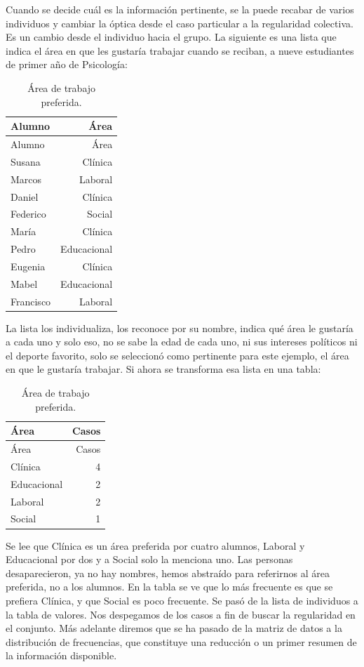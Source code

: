 \documentclass[]{book}
\begin{document}
Cuando se decide cuál es la información pertinente, se la puede recabar de varios individuos y cambiar la óptica desde el caso particular a la regularidad colectiva. Es un cambio desde el individuo hacia el grupo. La siguiente es una lista que indica el área en que les gustaría trabajar cuando se reciban, a nueve estudiantes de primer año de Psicología:

\begin{longtable}[]{@{}lr@{}}
\caption{\label{tab:unnamed-chunk-2}Área de trabajo preferida.}\tabularnewline
\toprule
Alumno & Área\tabularnewline
\midrule
\endfirsthead
\toprule
Alumno & Área\tabularnewline
\midrule
\endhead
Susana & Clínica\tabularnewline
Marcos & Laboral\tabularnewline
Daniel & Clínica\tabularnewline
Federico & Social\tabularnewline
María & Clínica\tabularnewline
Pedro & Educacional\tabularnewline
Eugenia & Clínica\tabularnewline
Mabel & Educacional\tabularnewline
Francisco & Laboral\tabularnewline
\bottomrule
\end{longtable}

La lista los individualiza, los reconoce por su nombre, indica qué área le gustaría a cada uno y solo eso, no se sabe la edad de cada uno, ni sus intereses políticos ni el deporte favorito, solo se seleccionó como pertinente para este ejemplo, el área en que le gustaría trabajar. Si ahora se transforma esa lista en una tabla:

\begin{longtable}[]{@{}lr@{}}
\caption{\label{tab:unnamed-chunk-3}Área de trabajo preferida.}\tabularnewline
\toprule
Área & Casos\tabularnewline
\midrule
\endfirsthead
\toprule
Área & Casos\tabularnewline
\midrule
\endhead
Clínica & 4\tabularnewline
Educacional & 2\tabularnewline
Laboral & 2\tabularnewline
Social & 1\tabularnewline
\bottomrule
\end{longtable}

Se lee que Clínica es un área preferida por cuatro alumnos, Laboral y Educacional por dos y a Social solo la menciona uno. Las personas desaparecieron, ya no hay nombres, hemos abstraído para referirnos al área preferida, no a los alumnos. En la tabla se ve que lo más frecuente es que se prefiera Clínica, y que Social es poco frecuente. Se pasó de la lista de individuos a la tabla de valores. Nos despegamos de los casos a fin de buscar la regularidad en el conjunto. Más adelante diremos que se ha pasado de la matriz de datos a la distribución de frecuencias, que constituye una reducción o un primer resumen de la información disponible.
\end{document}
